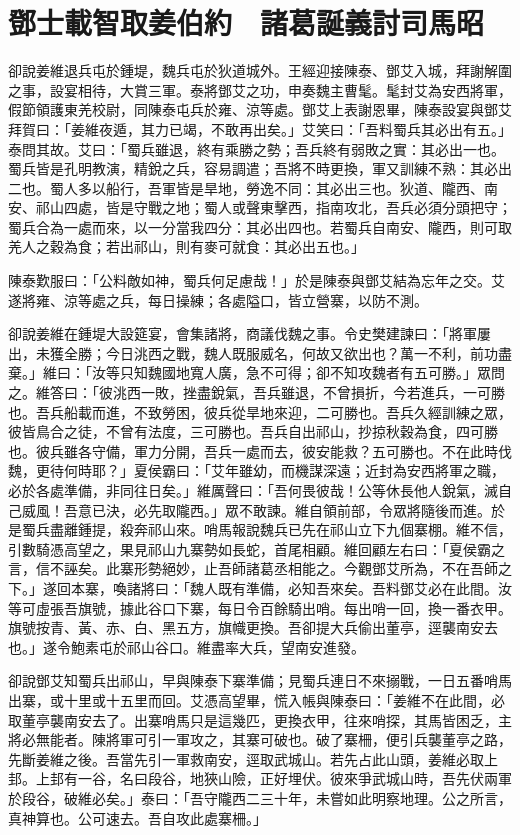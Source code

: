 
\chapter{鄧士載智取姜伯約　諸葛誕義討司馬昭}

卻說姜維退兵屯於鍾堤，魏兵屯於狄道城外。王經迎接陳泰、鄧艾入城，拜謝解圍之事，設宴相待，大賞三軍。泰將鄧艾之功，申奏魏主曹髦。髦封艾為安西將軍，假節領護東羌校尉，同陳泰屯兵於雍、涼等處。鄧艾上表謝恩畢，陳泰設宴與鄧艾拜賀曰：「姜維夜遁，其力已竭，不敢再出矣。」艾笑曰：「吾料蜀兵其必出有五。」泰問其故。艾曰：「蜀兵雖退，終有乘勝之勢；吾兵終有弱敗之實：其必出一也。蜀兵皆是孔明教演，精銳之兵，容易調遣；吾將不時更換，軍又訓練不熟：其必出二也。蜀人多以船行，吾軍皆是旱地，勞逸不同：其必出三也。狄道、隴西、南安、祁山四處，皆是守戰之地；蜀人或聲東擊西，指南攻北，吾兵必須分頭把守；蜀兵合為一處而來，以一分當我四分：其必出四也。若蜀兵自南安、隴西，則可取羌人之穀為食；若出祁山，則有麥可就食：其必出五也。」

陳泰歎服曰：「公料敵如神，蜀兵何足慮哉！」於是陳泰與鄧艾結為忘年之交。艾遂將雍、涼等處之兵，每日操練；各處隘口，皆立營寨，以防不測。

卻說姜維在鍾堤大設筵宴，會集諸將，商議伐魏之事。令史樊建諫曰：「將軍屢出，未獲全勝；今日洮西之戰，魏人既服威名，何故又欲出也？萬一不利，前功盡棄。」維曰：「汝等只知魏國地寬人廣，急不可得；卻不知攻魏者有五可勝。」眾問之。維答曰：「彼洮西一敗，挫盡銳氣，吾兵雖退，不曾損折，今若進兵，一可勝也。吾兵船載而進，不致勞困，彼兵從旱地來迎，二可勝也。吾兵久經訓練之眾，彼皆鳥合之徒，不曾有法度，三可勝也。吾兵自出祁山，抄掠秋穀為食，四可勝也。彼兵雖各守備，軍力分開，吾兵一處而去，彼安能救？五可勝也。不在此時伐魏，更待何時耶？」夏侯霸曰：「艾年雖幼，而機謀深遠；近封為安西將軍之職，必於各處準備，非同往日矣。」維厲聲曰：「吾何畏彼哉！公等休長他人銳氣，滅自己威風！吾意已決，必先取隴西。」眾不敢諫。維自領前部，令眾將隨後而進。於是蜀兵盡離鍾提，殺奔祁山來。哨馬報說魏兵已先在祁山立下九個寨棚。維不信，引數騎憑高望之，果見祁山九寨勢如長蛇，首尾相顧。維回顧左右曰：「夏侯霸之言，信不誣矣。此寨形勢絕妙，止吾師諸葛丞相能之。今觀鄧艾所為，不在吾師之下。」遂回本寨，喚諸將曰：「魏人既有準備，必知吾來矣。吾料鄧艾必在此間。汝等可虛張吾旗號，據此谷口下寨，每日令百餘騎出哨。每出哨一回，換一番衣甲。旗號按青、黃、赤、白、黑五方，旗幟更換。吾卻提大兵偷出董亭，逕襲南安去也。」遂令鮑素屯於祁山谷口。維盡率大兵，望南安進發。

卻說鄧艾知蜀兵出祁山，早與陳泰下寨準備；見蜀兵連日不來搦戰，一日五番哨馬出寨，或十里或十五里而回。艾憑高望畢，慌入帳與陳泰曰：「姜維不在此間，必取董亭襲南安去了。出寨哨馬只是這幾匹，更換衣甲，往來哨探，其馬皆困乏，主將必無能者。陳將軍可引一軍攻之，其寨可破也。破了寨柵，便引兵襲董亭之路，先斷姜維之後。吾當先引一軍救南安，逕取武城山。若先占此山頭，姜維必取上邽。上邽有一谷，名曰段谷，地狹山險，正好埋伏。彼來爭武城山時，吾先伏兩軍於段谷，破維必矣。」泰曰：「吾守隴西二三十年，未嘗如此明察地理。公之所言，真神算也。公可速去。吾自攻此處寨柵。」

